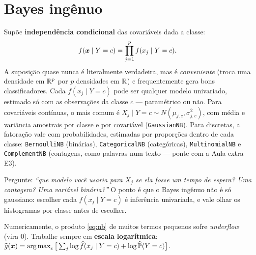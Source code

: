 \documentclass[11pt,a4paper]{article}
\begin{document}
\section{Bayes ingênuo}
Supõe \textbf{independência condicional} das covariáveis dada a classe:
\begin{equation}\label{eq:nb}
  f(\bm{x}\mid Y=c) = \prod_{j=1}^p f(x_j\mid Y=c).
\end{equation}
A suposição quase nunca é literalmente verdadeira, mas é \emph{conveniente} (troca
uma densidade em $\mathbb{R}^p$ por $p$ densidades em $\mathbb{R}$) e frequentemente gera bons
classificadores. Cada $f(x_j\mid Y=c)$ pode ser qualquer modelo univariado, estimado
só com as observações da classe $c$ --- paramétrico ou não. Para covariáveis
contínuas, o mais comum é $X_j\mid Y=c \sim N(\mu_{j,c},\sigma^2_{j,c})$, com média
e variância amostrais por classe e por covariável (\texttt{GaussianNB}). Para
discretas, a fatoração vale com probabilidades, estimadas por proporções dentro de
cada classe: \texttt{BernoulliNB} (binárias), \texttt{CategoricalNB} (categóricas),
\texttt{MultinomialNB} e \texttt{ComplementNB} (contagens, como palavras num texto
--- ponte com a Aula extra E3).

\begin{emsala}
Pergunte: \emph{``que modelo você usaria para $X_j$ se ela fosse um tempo de espera?
Uma contagem? Uma variável binária?''} O ponto é que o Bayes ingênuo não é só
gaussiano: escolher cada $f(x_j\mid Y=c)$ é inferência univariada, e vale olhar os
histogramas por classe antes de escolher.
\end{emsala}

\begin{atencao}
Numericamente, o produto \eqref{eq:nb} de muitos termos pequenos sofre
\emph{underflow} (vira $0$). Trabalhe sempre em \textbf{escala logarítmica}:
$\ghat(\x)=\argmax_c\big[\sum_j \log \widehat f(x_j\mid Y=c)+\log\widehat\Prob(Y=c)\big]$.
\end{atencao}

\end{document}

